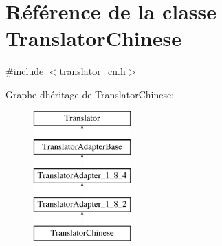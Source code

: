 \hypertarget{class_translator_chinese}{}\section{Référence de la classe Translator\+Chinese}
\label{class_translator_chinese}


{\ttfamily \#include $<$translator\+\_\+cn.\+h$>$}

Graphe d\textquotesingle{}héritage de Translator\+Chinese\+:\begin{figure}[H]
\begin{center}
\leavevmode
\includegraphics[height=5.000000cm]{class_translator_chinese}
\end{center}
\end{figure}
